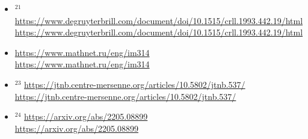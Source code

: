 \documentclass[10pt]{article}
\begin{document}
\begin{itemize}
\href{https://arxiv.org/abs/1004.3652}{https://arxiv.org/abs/1004.3652}
  \item[] ${ }^{21}$ \href{https://www.degruyterbrill.com/document/doi/10.1515/crll.1993.442.19/html}{https://www.degruyterbrill.com/document/doi/10.1515/crll.1993.442.19/html}\\
\href{https://www.degruyterbrill.com/document/doi/10.1515/crll.1993.442.19/html}{https://www.degruyterbrill.com/document/doi/10.1515/crll.1993.442.19/html}
  \item[223236] \href{https://www.mathnet.ru/eng/im314}{https://www.mathnet.ru/eng/im314}\\
\href{https://www.mathnet.ru/eng/im314}{https://www.mathnet.ru/eng/im314}
  \item[] ${ }^{23}$ \href{https://jtnb.centre-mersenne.org/articles/10.5802/jtnb.537/}{https://jtnb.centre-mersenne.org/articles/10.5802/jtnb.537/}\\
\href{https://jtnb.centre-mersenne.org/articles/10.5802/jtnb.537/}{https://jtnb.centre-mersenne.org/articles/10.5802/jtnb.537/}
  \item[] ${ }^{24}$ \href{https://arxiv.org/abs/2205.08899}{https://arxiv.org/abs/2205.08899}\\
\href{https://arxiv.org/abs/2205.08899}{https://arxiv.org/abs/2205.08899}
\end{itemize}
\end{document}
